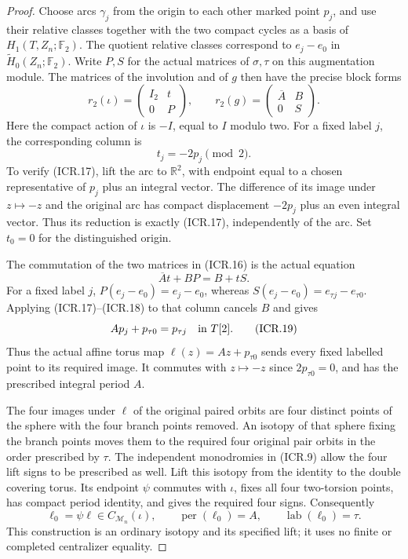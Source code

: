 \begin{proof}
Choose arcs $\gamma_j$ from the origin to each other marked point
$p_j$, and use their relative classes together with the two compact
cycles as a basis of $H_1(T,Z_n;\mathbb F_2)$.
The quotient relative classes correspond to
$e_j-e_0$ in $\widetilde H_0(Z_n;\mathbb F_2)$.
Write $P,S$ for the actual matrices of $\sigma,\tau$ on this
augmentation module.  The matrices of the involution and of $g$
then have the precise block forms
\[
 r_2(\iota)=\begin{pmatrix}I_2&t\\0&P\end{pmatrix},\qquad
 r_2(g)=\begin{pmatrix}\overline A&B\\0&S\end{pmatrix}.
                                                               \tag{ICR.16}
\]
Here the compact action of $\iota$ is $-I$, equal to $I$ modulo two.
For a fixed label $j$, the corresponding column is
\[
                           t_j=-2p_j\pmod2.
                                                               \tag{ICR.17}
\]
To verify (ICR.17), lift the arc to $\mathbb R^2$, with endpoint
equal to a chosen representative of $p_j$ plus an integral vector.
The difference of its image under $z\mapsto-z$ and the original
arc has compact displacement $-2p_j$ plus an even integral vector.
Thus its reduction is exactly (ICR.17), independently of the arc.
Set $t_0=0$ for the distinguished origin.

The commutation of the two matrices in (ICR.16) is the actual equation
\[
                        \overline A t+B P=B+t S.
                                                               \tag{ICR.18}
\]
For a fixed label $j$, $P(e_j-e_0)=e_j-e_0$, whereas
$S(e_j-e_0)=e_{\tau j}-e_{\tau0}$.  Applying (ICR.17)--(ICR.18)
to that column cancels $B$ and gives
\[
            A p_j+p_{\tau0}=p_{\tau j}\quad\hbox{in }T[2].
                                                               \tag{ICR.19}
\]
Thus the actual affine torus map
$\ell(z)=Az+p_{\tau0}$ sends every fixed labelled point to its
required image.  It commutes with $z\mapsto-z$ since
$2p_{\tau0}=0$, and has the prescribed integral period $A$.

The four images under $\ell$ of the original paired orbits are
four distinct points of the sphere with the four branch points
removed.  An isotopy of that sphere fixing the branch points moves
them to the required four original pair orbits in the order
prescribed by $\tau$.  The independent monodromies in (ICR.9)
allow the four lift signs to be prescribed as well.  Lift this
isotopy from the identity to the double covering torus.  Its endpoint
$\psi$ commutes with $\iota$, fixes all four two-torsion points,
has compact period identity, and gives the required four signs.
Consequently
\[
             \ell_0=\psi\ell\in C_{\mathcal M_n}(\iota),
 \qquad \operatorname{per}(\ell_0)=A,
 \qquad \operatorname{lab}(\ell_0)=\tau.
                                                               \tag{ICR.20}
\]
This construction is an ordinary isotopy and its specified lift;
it uses no finite or completed centralizer equality.


\end{proof}
